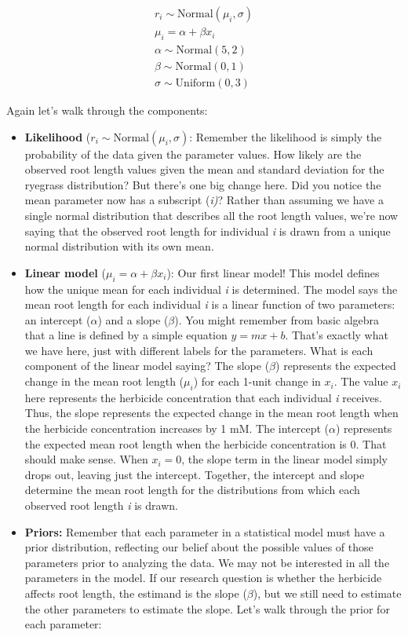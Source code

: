 \documentclass[
]{book}
\begin{document}
\[
\begin{array}{l}
r_i \sim \mathrm{Normal}(\mu_i, \sigma) \\
\mu_i = \alpha + \beta x_i \\ 
\alpha \sim \mathrm{Normal}(5, 2) \\
\beta \sim \mathrm{Normal}(0, 1) \\
\sigma \sim \mathrm{Uniform}(0, 3)
\end{array}
\]

Again let's walk through the components:

\begin{itemize}
\item
  \textbf{Likelihood} (\(r_i \sim \mathrm{Normal}(\mu_i, \sigma)\): Remember the likelihood is simply the probability of the data given the parameter values. How likely are the observed root length values given the mean and standard deviation for the ryegrass distribution? But there's one big change here. Did you notice the mean parameter now has a subscript (\emph{i)}? Rather than assuming we have a single normal distribution that describes all the root length values, we're now saying that the observed root length for individual \emph{i} is drawn from a unique normal distribution with its own mean.
\item
  \textbf{Linear model} (\(\mu_i = \alpha + \beta x_i\)): Our first linear model! This model defines how the unique mean for each individual \emph{i} is determined. The model says the mean root length for each individual \emph{i} is a linear function of two parameters: an intercept (\(\alpha\)) and a slope (\(\beta\)). You might remember from basic algebra that a line is defined by a simple equation \(y = mx + b\). That's exactly what we have here, just with different labels for the parameters. What is each component of the linear model saying? The slope (\(\beta\)) represents the expected change in the mean root length (\(\mu_i\)) for each 1-unit change in \(x_i\). The value \(x_i\) here represents the herbicide concentration that each individual \emph{i} receives. Thus, the slope represents the expected change in the mean root length when the herbicide concentration increases by 1 mM. The intercept (\(\alpha\)) represents the expected mean root length when the herbicide concentration is 0. That should make sense. When \(x_i=0\), the slope term in the linear model simply drops out, leaving just the intercept. Together, the intercept and slope determine the mean root length for the distributions from which each observed root length \emph{i} is drawn.
\item
  \textbf{Priors:} Remember that each parameter in a statistical model must have a prior distribution, reflecting our belief about the possible values of those parameters prior to analyzing the data. We may not be interested in all the parameters in the model. If our research question is whether the herbicide affects root length, the estimand is the slope (\(\beta\)), but we still need to estimate the other parameters to estimate the slope. Let's walk through the prior for each parameter:


\end{itemize}
\end{document}
